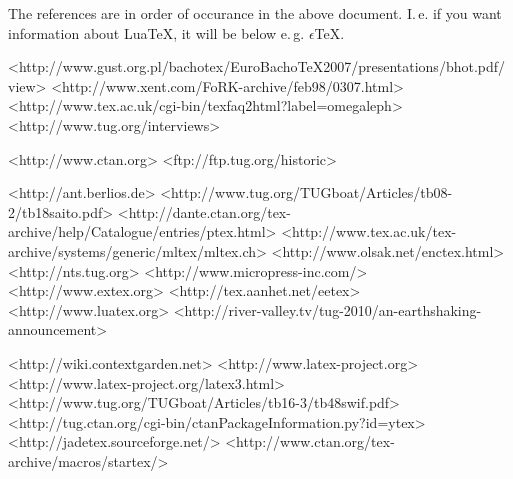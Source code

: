 \documentclass[
%
]{scrartcl}
\begin{document}
The references are in order of occurance in the above document. I.\,e. if you want information about Lua\TeX, it will be below e.\,g. $\epsilon$\TeX.


	  <http://www.gust.org.pl/bachotex/EuroBachoTeX2007/presentations/bhot.pdf/view>
	<http://www.xent.com/FoRK-archive/feb98/0307.html>
	<http://www.tex.ac.uk/cgi-bin/texfaq2html?label=omegaleph>
	<http://www.tug.org/interviews>
	
	<http://www.ctan.org>
	<ftp://ftp.tug.org/historic>

	<http://ant.berlios.de>
		<http://www.tug.org/TUGboat/Articles/tb08-2/tb18saito.pdf>
	<http://dante.ctan.org/tex-archive/help/Catalogue/entries/ptex.html>
	<http://www.tex.ac.uk/tex-archive/systems/generic/mltex/mltex.ch>
	<http://www.olsak.net/enctex.html>
	<http://nts.tug.org>
	<http://www.micropress-inc.com/>	
	<http://www.extex.org>	
	<http://tex.aanhet.net/eetex>	
	<http://www.luatex.org>
	<http://river-valley.tv/tug-2010/an-earthshaking-announcement>
	
	<http://wiki.contextgarden.net>
	<http://www.latex-project.org>
	<http://www.latex-project.org/latex3.html>
	<http://www.tug.org/TUGboat/Articles/tb16-3/tb48swif.pdf>
	<http://tug.ctan.org/cgi-bin/ctanPackageInformation.py?id=ytex>
	<http://jadetex.sourceforge.net/>
	<http://www.ctan.org/tex-archive/macros/startex/>
\end{document}
